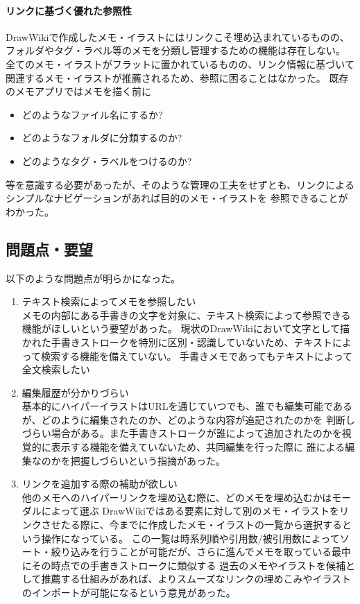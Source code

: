\paragraph*{リンクに基づく優れた参照性}
DrawWikiで作成したメモ・イラストにはリンクこそ埋め込まれているものの、フォルダやタグ・ラベル等のメモを分類し管理するための機能は存在しない。
全てのメモ・イラストがフラットに置かれているものの、リンク情報に基づいて関連するメモ・イラストが推薦されるため、参照に困ることはなかった。
既存のメモアプリではメモを描く前に
\begin{itemize}
    \item どのようなファイル名にするか?
    \item どのようなフォルダに分類するのか?
    \item どのようなタグ・ラベルをつけるのか?
\end{itemize}
等を意識する必要があったが、そのような管理の工夫をせずとも、リンクによるシンプルなナビゲーションがあれば目的のメモ・イラストを
参照できることがわかった。

\subsection{問題点・要望}
以下のような問題点が明らかになった。
\begin{enumerate}
    \item テキスト検索によってメモを参照したい\\
    メモの内部にある手書きの文字を対象に、テキスト検索によって参照できる機能がほしいという要望があった。
    現状のDrawWikiにおいて文字として描かれた手書きストロークを特別に区別・認識していないため、テキストによって検索する機能を備えていない。
    手書きメモであってもテキストによって全文検索したい
    \item 編集履歴が分かりづらい\\
    基本的にハイパーイラストはURLを通じていつでも、誰でも編集可能であるが、どのように編集されたのか、どのような内容が追記されたのかを
    判断しづらい場合がある。また手書きストロークが誰によって追加されたのかを視覚的に表示する機能を備えていないため、共同編集を行った際に
    誰による編集なのかを把握しづらいという指摘があった。
    \item リンクを追加する際の補助が欲しい\\
    他のメモへのハイパーリンクを埋め込む際に、どのメモを埋め込むかはモーダルによって選ぶ
    DrawWikiではある要素に対して別のメモ・イラストをリンクさせたる際に、今までに作成したメモ・イラストの一覧から選択するという操作になっている。
    この一覧は時系列順や引用数/被引用数によってソート・絞り込みを行うことが可能だが、さらに進んでメモを取っている最中にその時点での手書きストロークに類似する
    過去のメモやイラストを候補として推薦する仕組みがあれば、よりスムーズなリンクの埋めこみやイラストのインポートが可能になるという意見があった。
\end{enumerate}

